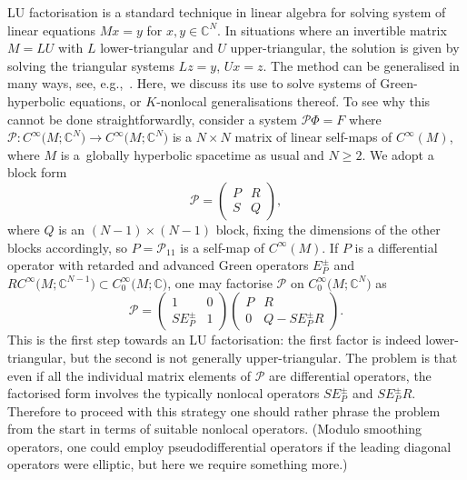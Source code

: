 \documentclass[pdftex]{sigma}
\numberwithin{equation}{section}
\newcommand{\CC}{{\mathbb C}}
\newcommand{\CoinX}[1]{C_0^\infty\big({#1}\big)}
\newcommand{\Ps}{\mathcal{P}}
\begin{document}
 LU factorisation is a standard technique in linear algebra for solving system of linear equations $Mx=y$ for $x,y\in \CC^N$. In situations where an invertible matrix $M=LU$ with $L$ lower-triangular and $U$ upper-triangular, the solution is given by solving the triangular systems $Lz=y$, $Ux=z$. The method can be generalised in many ways, see, e.g.,~\cite{HornJohnson_vol1}. Here, we discuss its use to solve systems of Green-hyperbolic equations, or $K$-nonlocal generalisations thereof.
 To see why this cannot be done straightforwardly, consider a system $\Ps \Phi = F$ where $\Ps\colon C^\infty\big(M;\CC^N\big)\to C^\infty\big(M;\CC^N\big)$ is a $N\times N$ matrix of
 linear self-maps of $C^\infty(M)$, where $M$ is a~globally hyperbolic spacetime as usual and $N\ge 2$. We adopt a block form
 \begin{equation*}
 	\Ps = \begin{pmatrix} P & R \\ S & Q\end{pmatrix},
 \end{equation*}
 where $Q$ is an $(N-1)\times (N-1)$ block, fixing the dimensions of the other blocks accordingly, so $P=\Ps_{11}$ is a self-map of $C^\infty(M)$. If $P$ is a differential operator with retarded and advanced Green operators $E^\pm_P$ and $R C^\infty\big(M;\CC^{N-1}\big)\subset
 \CoinX{M;\CC}$, one may factorise $\Ps$ on $\CoinX{M;\CC^N}$ as
 \begin{equation}\label{eq:LU1}
 	\Ps = \begin{pmatrix} 1 & 0 \\ SE_P^\pm & 1\end{pmatrix}\begin{pmatrix} P & R \\ 0 & Q - SE_P^\pm R \end{pmatrix}.
 \end{equation}
 This is the first step towards an LU factorisation: the first factor is indeed lower-triangular, but the second is not generally upper-triangular. The problem is that even if all the individual matrix elements of $\Ps$ are
 differential operators, the factorised form involves the typically nonlocal operators $SE^\pm_P$ and $SE^\pm_PR$. Therefore to proceed with this strategy one should rather phrase the problem from the start in terms of suitable nonlocal operators. (Modulo smoothing operators, one could employ pseudodifferential operators if the leading diagonal operators were elliptic, but here we require something more.)
\end{document}

